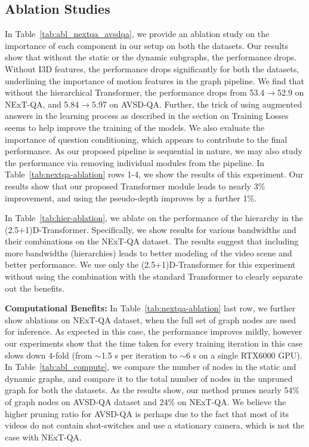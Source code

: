 \documentclass[letterpaper]{article} \usepackage{aaai22}  \usepackage{times}  \usepackage{helvet}  \usepackage{courier}  \usepackage[hyphens]{url}  \usepackage{graphicx} \urlstyle{rm} \def\UrlFont{\rm}  \usepackage{natbib}  \usepackage{caption} \DeclareCaptionStyle{ruled}{labelfont=normalfont,labelsep=colon,strut=off} \frenchspacing  \setlength{\pdfpagewidth}{8.5in}  \setlength{\pdfpageheight}{11in}  \usepackage{algorithm}
\newcommand{\nameTxr}{(2.5+1)D-Transformer\xspace}
\begin{document}
\subsection{Ablation Studies}
In Table~\ref{tab:abl_nextqa_avsdqa}, we provide an ablation study on the importance of each component in our setup on both the datasets. Our results show that without the static or the dynamic subgraphs, the performance drops. Without I3D features, the performance drops significantly for both the datasets, underlining the importance of motion features in the graph pipeline. We find that without the hierarchical Transformer, the performance drops from 53.4$\to$52.9 on NExT-QA, and 5.84$\to$5.97 on AVSD-QA. Further, the trick of using augmented answers in the learning process as described in the section on Training Losses seems to help improve the training of the models. We also evaluate the importance of question conditioning, which appears to contribute to the final performance. As our proposed pipeline is sequential in nature, we may also study the performance via removing individual modules from the pipeline. In Table~\ref{tab:nextqa-ablation} rows 1-4, we show the results of this experiment. Our results show that our proposed Transformer module leads to nearly 3\% improvement, and using the pseudo-depth improves by a further 1\%. 

In Table~\ref{tab:hier-ablation}, we ablate on the performance of the hierarchy in the \nameTxr. Specifically, we show results for various bandwidths and their combinations on the NExT-QA dataset. The results suggest that including more bandwidths (hierarchies) leads to better modeling of the video scene and better performance. We use only the \nameTxr for this experiment without using the combination with the standard Transformer to clearly separate out the benefits.

\noindent\textbf{Computational Benefits:} In Table~\ref{tab:nextqa-ablation} last row, we further show ablations on NExT-QA dataset, when the full set of graph nodes are used for inference. As expected in this case, the performance improves mildly, however our experiments show that the time taken for every training iteration in this case slows down 4-fold (from $\sim$1.5 s per iteration to $\sim$6 s on a single RTX6000 GPU). In Table~\ref{tab:abl_compute}, we compare the number of nodes in the static and dynamic graphs, and compare it to the total number of nodes in the unpruned graph for both the datasets. As the results show, our method prunes nearly 54\% of graph nodes on AVSD-QA dataset and 24\% on NExT-QA. We believe the higher pruning ratio for AVSD-QA is perhaps due to the fact that most of its videos do not contain shot-switches and use a stationary camera, which is not the case with NExT-QA.
\end{document}
